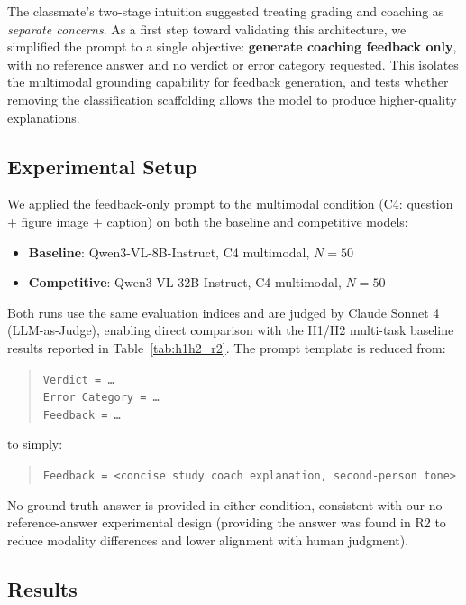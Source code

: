 \documentclass{article}
\begin{document}
The classmate's two-stage intuition suggested treating grading and coaching as \emph{separate concerns}.
As a first step toward validating this architecture, we simplified the prompt to a single objective:
\textbf{generate coaching feedback only}, with no reference answer and no verdict or error category
requested. This isolates the multimodal grounding capability for feedback generation, and tests
whether removing the classification scaffolding allows the model to produce higher-quality explanations.

\subsection{Experimental Setup}

We applied the feedback-only prompt to the multimodal condition (C4: question + figure image + caption)
on both the baseline and competitive models:

\begin{itemize}[itemsep=4pt]
    \item \textbf{Baseline}: Qwen3-VL-8B-Instruct, C4 multimodal, $N{=}50$
    \item \textbf{Competitive}: Qwen3-VL-32B-Instruct, C4 multimodal, $N{=}50$
\end{itemize}

Both runs use the same evaluation indices and are judged by Claude Sonnet 4 (LLM-as-Judge), enabling
direct comparison with the H1/H2 multi-task baseline results reported in Table~\ref{tab:h1h2_r2}.
The prompt template is reduced from:

\begin{quote}
\texttt{Verdict = \ldots} \\
\texttt{Error Category = \ldots} \\
\texttt{Feedback = \ldots}
\end{quote}

to simply:

\begin{quote}
\texttt{Feedback = \textless concise study coach explanation, second-person tone\textgreater}
\end{quote}

No ground-truth answer is provided in either condition, consistent with our no-reference-answer
experimental design (providing the answer was found in R2 to reduce modality differences and lower
alignment with human judgment).

\subsection{Results}
\end{document}
